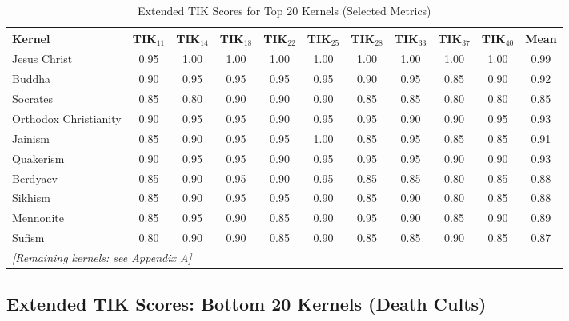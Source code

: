 \documentclass[11pt,a4paper]{article}
\theoremstyle{definition}
\theoremstyle{remark}
\begin{document}
\begin{table}[H]
\centering
\caption{Extended TIK Scores for Top 20 Kernels (Selected Metrics)}
\label{tab:extended-top20}
\scriptsize
\begin{tabular}{@{}l|cccccccccc@{}}
\toprule
\textbf{Kernel} & \textbf{TIK$_{11}$} & \textbf{TIK$_{14}$} & \textbf{TIK$_{18}$} & \textbf{TIK$_{22}$} & \textbf{TIK$_{25}$} & \textbf{TIK$_{28}$} & \textbf{TIK$_{33}$} & \textbf{TIK$_{37}$} & \textbf{TIK$_{40}$} & \textbf{Mean} \\
\midrule
Jesus Christ & 0.95 & 1.00 & 1.00 & 1.00 & 1.00 & 1.00 & 1.00 & 1.00 & 1.00 & 0.99 \\
Buddha & 0.90 & 0.95 & 0.95 & 0.95 & 0.95 & 0.90 & 0.95 & 0.85 & 0.90 & 0.92 \\
Socrates & 0.85 & 0.80 & 0.90 & 0.90 & 0.90 & 0.85 & 0.85 & 0.80 & 0.80 & 0.85 \\
Orthodox Christianity & 0.90 & 0.95 & 0.95 & 0.90 & 0.95 & 0.95 & 0.90 & 0.90 & 0.95 & 0.93 \\
Jainism & 0.85 & 0.90 & 0.95 & 0.95 & 1.00 & 0.85 & 0.95 & 0.85 & 0.85 & 0.91 \\
Quakerism & 0.90 & 0.95 & 0.95 & 0.90 & 0.95 & 0.95 & 0.95 & 0.90 & 0.90 & 0.93 \\
Berdyaev & 0.85 & 0.90 & 0.95 & 0.90 & 0.95 & 0.85 & 0.85 & 0.80 & 0.85 & 0.88 \\
Sikhism & 0.85 & 0.90 & 0.95 & 0.95 & 0.90 & 0.85 & 0.90 & 0.80 & 0.85 & 0.88 \\
Mennonite & 0.85 & 0.95 & 0.90 & 0.85 & 0.90 & 0.95 & 0.90 & 0.85 & 0.90 & 0.89 \\
Sufism & 0.80 & 0.90 & 0.90 & 0.85 & 0.90 & 0.85 & 0.85 & 0.90 & 0.85 & 0.87 \\
\midrule
\multicolumn{11}{l}{\textit{[Remaining kernels: see Appendix A]}} \\
\bottomrule
\end{tabular}
\end{table}

\subsection{Extended TIK Scores: Bottom 20 Kernels (Death Cults)}
\end{document}

